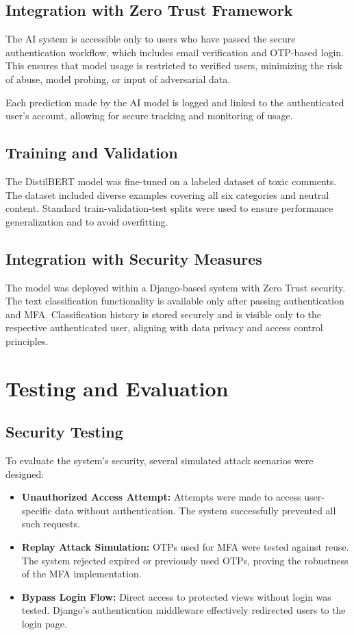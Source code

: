 \documentclass[a4paper,12pt]{article}
\begin{document}
\subsection{Integration with Zero Trust Framework}
The AI system is accessible only to users who have passed the secure authentication workflow, which includes email verification and OTP-based login. This ensures that model usage is restricted to verified users, minimizing the risk of abuse, model probing, or input of adversarial data.

Each prediction made by the AI model is logged and linked to the authenticated user's account, allowing for secure tracking and monitoring of usage.

\subsection{Training and Validation}
The DistilBERT model was fine-tuned on a labeled dataset of toxic comments. The dataset included diverse examples covering all six categories and neutral content. Standard train-validation-test splits were used to ensure performance generalization and to avoid overfitting.

\subsection{Integration with Security Measures}
The model was deployed within a Django-based system with Zero Trust security. The text classification functionality is available only after passing authentication and MFA. Classification history is stored securely and is visible only to the respective authenticated user, aligning with data privacy and access control principles.

\section{Testing and Evaluation}

\subsection{Security Testing}
To evaluate the system's security, several simulated attack scenarios were designed:

\begin{itemize}
    \item \textbf{Unauthorized Access Attempt:} Attempts were made to access user-specific data without authentication. The system successfully prevented all such requests.
    \item \textbf{Replay Attack Simulation:} OTPs used for MFA were tested against reuse. The system rejected expired or previously used OTPs, proving the robustness of the MFA implementation.
    \item \textbf{Bypass Login Flow:} Direct access to protected views without login was tested. Django's authentication middleware effectively redirected users to the login page.
\end{itemize}
\end{document}
